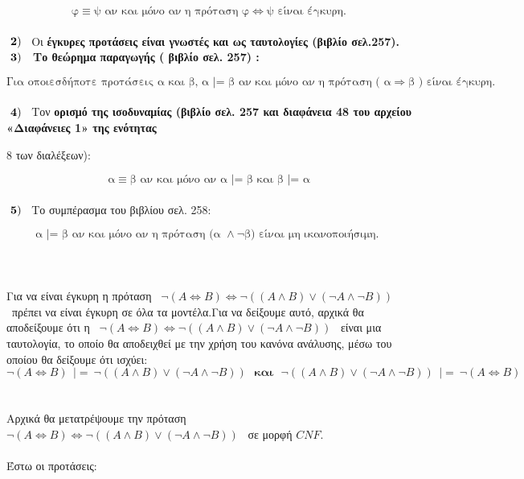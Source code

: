 \documentclass[10pt]{article}
\begin{document}
\[ \text{φ} \equiv  \text{ψ αν και μόνο αν η πρόταση φ} \Leftrightarrow \text{ψ είναι έγκυρη.} \] \\

\hspace{5mm} $\bf \ 2) \normalfont$ \ Οι \bf έγκυρες προτάσεις \normalfont είναι γνωστές και ως \bf ταυτολογίες \normalfont (βιβλίο σελ.257). \\

\hspace{5mm} $\bf \ 3) \normalfont$ \ Το \bf θεώρημα παραγωγής \normalfont ( βιβλίο σελ. 257) :

\[ \text{Για οποιεσδήποτε προτάσεις α και β, α } |\text{= β αν και μόνο αν η πρόταση ( α} \Rightarrow   \text{β ) είναι έγκυρη.}\] \\

\hspace{5mm} $\bf \ 4) \normalfont$ \ Τον \bf ορισμό της ισοδυναμίας \normalfont (βιβλίο σελ. 257 και διαφάνεια 48 του αρχείου «Διαφάνειες 1» της ενότητας

\hspace{13mm}8 των διαλέξεων):

\[
\text{α} \equiv \text{β αν και μόνο αν α } |\text{= β και β } |\text{= α}
\] \\

\hspace{5mm} $\bf \ 5) \normalfont$ \ Το συμπέρασμα του βιβλίου σελ. 258:

\[
\text{α } | \text{= β αν και μόνο αν η πρόταση (α } \wedge \neg\text{β) είναι μη ικανοποιήσιμη. } \] \\
\\ \\
Για να είναι έγκυρη η πρόταση \ $\neg(A \Leftrightarrow B) \Leftrightarrow \neg((A \wedge B) \vee (\neg A \wedge \neg B)) $ \  πρέπει να είναι έγκυρη σε όλα τα μοντέλα.Για να δείξουμε αυτό, αρχικά θα αποδείξουμε ότι η \ $\neg(A \Leftrightarrow B) \Leftrightarrow \neg((A \wedge B) \vee (\neg A \wedge \neg B)) $ \  είναι μια ταυτολογία, το οποίο θα αποδειχθεί με την χρήση του κανόνα ανάλυσης, μέσω του οποίου θα δείξουμε ότι ισχύει: \\
\[ \neg(A \Leftrightarrow B) \ \ |= \ \neg((A \wedge B) \vee (\neg A \wedge \neg B)) \ \ \ \textbf{και} \ \ \ \neg((A \wedge B) \vee (\neg A \wedge \neg B)) \ \ |= \ \neg(A \Leftrightarrow B) \] \\ \\
Αρχικά θα μετατρέψουμε την πρόταση \ $\neg(A \Leftrightarrow B) \Leftrightarrow \neg((A \wedge B) \vee (\neg A \wedge \neg B)) $ \  σε μορφή $CNF$.\\ \\
Έστω οι προτάσεις: \\
\end{document}
